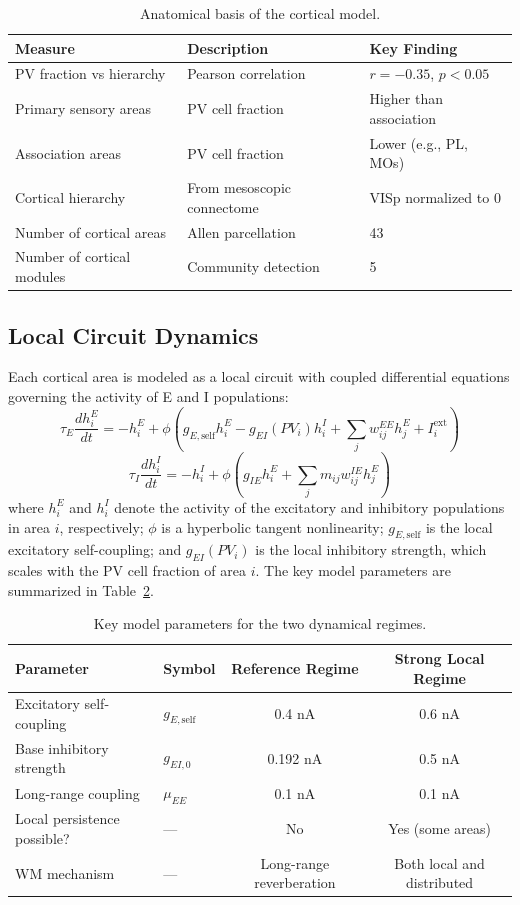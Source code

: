 \documentclass[11pt]{article}
\begin{document}
\begin{table}[h]
\centering
\caption{Anatomical basis of the cortical model.}
\label{tab:anatomy}
\begin{tabular}{lll}
\toprule
Measure & Description & Key Finding \\
\midrule
PV fraction vs hierarchy & Pearson correlation & $r = -0.35$, $p < 0.05$ \\
Primary sensory areas & PV cell fraction & Higher than association \\
Association areas & PV cell fraction & Lower (e.g., PL, MOs) \\
Cortical hierarchy & From mesoscopic connectome & VISp normalized to 0 \\
Number of cortical areas & Allen parcellation & 43 \\
Number of cortical modules & Community detection & 5 \\
\bottomrule
\end{tabular}
\end{table}

\subsection{Local Circuit Dynamics}

Each cortical area is modeled as a local circuit with coupled differential equations governing the activity of E and I populations:
\begin{equation}
\tau_E \frac{dh_i^E}{dt} = -h_i^E + \phi\left(g_{E,\text{self}} h_i^E - g_{EI}(PV_i) h_i^I + \sum_j w_{ij}^{EE} h_j^E + I_i^{\text{ext}}\right)
\end{equation}
\begin{equation}
\tau_I \frac{dh_i^I}{dt} = -h_i^I + \phi\left(g_{IE} h_i^E + \sum_j m_{ij} w_{ij}^{IE} h_j^E\right)
\end{equation}
where $h_i^E$ and $h_i^I$ denote the activity of the excitatory and inhibitory populations in area $i$, respectively; $\phi$ is a hyperbolic tangent nonlinearity; $g_{E,\text{self}}$ is the local excitatory self-coupling; and $g_{EI}(PV_i)$ is the local inhibitory strength, which scales with the PV cell fraction of area $i$. The key model parameters are summarized in Table~\ref{tab:params}.

\begin{table}[h]
\centering
\caption{Key model parameters for the two dynamical regimes.}
\label{tab:params}
\begin{tabular}{llcc}
\toprule
Parameter & Symbol & Reference Regime & Strong Local Regime \\
\midrule
Excitatory self-coupling & $g_{E,\text{self}}$ & 0.4 nA & 0.6 nA \\
Base inhibitory strength & $g_{EI,0}$ & 0.192 nA & 0.5 nA \\
Long-range coupling & $\mu_{EE}$ & 0.1 nA & 0.1 nA \\
Local persistence possible? & --- & No & Yes (some areas) \\
WM mechanism & --- & Long-range reverberation & Both local and distributed \\
\bottomrule
\end{tabular}
\end{table}
\end{document}
